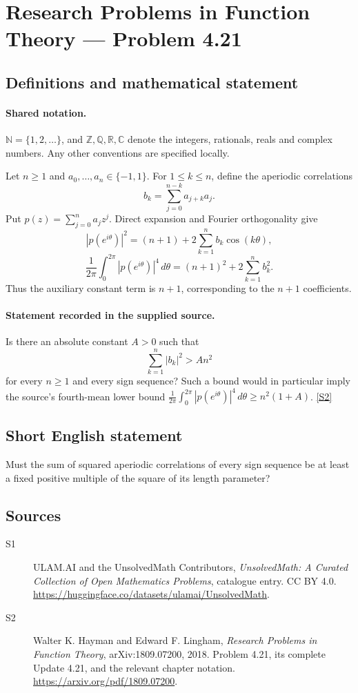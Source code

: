 \documentclass[11pt]{book}
\newcommand{\sref}[2]{\hyperlink{source:#1:#2}{[S#2]}}
\begin{document}
\section{Research Problems in Function Theory — Problem 4.21}\label{statement}

\subsection{Definitions and mathematical statement}

\paragraph{Shared notation.}$\mathbb N=\{1,2,\ldots\}$, and $\mathbb Z,\mathbb Q,\mathbb R,\mathbb C$ denote the integers, rationals, reals and complex numbers. Any other conventions are specified locally.


Let $n\ge1$ and $a_0,\ldots,a_n\in\{-1,1\}$. For $1\le k\le n$, define the aperiodic correlations
\[b_k=\sum_{j=0}^{n-k}a_{j+k}a_j.
\]
Put $p(z)=\sum_{j=0}^na_jz^j$. Direct expansion and Fourier orthogonality give
\[|p(e^{i\theta})|^2=(n+1)+2\sum_{k=1}^nb_k\cos(k\theta),\]
\[\frac1{2\pi}\int_0^{2\pi}|p(e^{i\theta})|^4\,d\theta=(n+1)^2+2\sum_{k=1}^nb_k^2.
\]
Thus the auxiliary constant term is $n+1$, corresponding to the $n+1$ coefficients.
\paragraph{Statement recorded in the supplied source.}
Is there an absolute constant $A>0$ such that
\[\sum_{k=1}^n|b_k|^2>An^2\]
for every $n\ge1$ and every sign sequence? Such a bound would in particular imply the source's fourth-mean lower bound $\frac1{2\pi}\int_0^{2\pi}|p(e^{i\theta})|^4\,d\theta\ge n^2(1+A)$. \sref{statement}{2}
\subsection{Short English statement}
Must the sum of squared aperiodic correlations of every sign sequence be at least a fixed positive multiple of the square of its length parameter?
\subsection{Sources}
\begin{description}
\item[\hypertarget{source:statement:1}{S1}] ULAM.AI and the UnsolvedMath Contributors, \emph{UnsolvedMath: A Curated Collection of Open Mathematics Problems}, catalogue entry. CC BY 4.0. \url{https://huggingface.co/datasets/ulamai/UnsolvedMath}.
\item[\hypertarget{source:statement:2}{S2}] Walter K. Hayman and Edward F. Lingham, \emph{Research Problems in Function Theory}, arXiv:1809.07200, 2018. Problem 4.21, its complete Update 4.21, and the relevant chapter notation. \url{https://arxiv.org/pdf/1809.07200}.
\end{description}
\label{end:statement}
\end{document}
